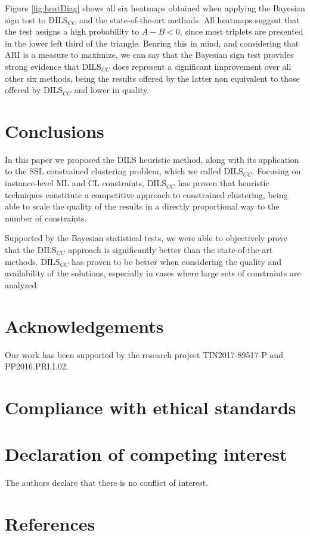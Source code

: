 \documentclass[review]{elsarticle}
\begin{document}
Figure \ref{fig:heatDiag} shows all six heatmaps obtained when applying the Bayesian sign test to DILS$_{CC}$ and the state-of-the-art methods. All heatmaps suggest that the test assigns a high probability to $A - B < 0$, since most triplets are presented in the lower left third of the triangle. Bearing this in mind, and considering that ARI is a measure to maximize, we can say that the Bayesian sign test provides strong evidence that DILS$_{CC}$ does represent a significant improvement over all other six methods, being the results offered by the latter non equivalent to those offered by DILS$_{CC}$ and lower in quality.

\clearpage

\section{Conclusions} \label{sec:conclusiones}

In this paper we proposed the DILS heuristic method, along with its application to the SSL constrained clustering problem, which we called DILS$_{CC}$. Focusing on instance-level ML and CL constraints, DILS$_{CC}$ has proven that heuristic techniques constitute a competitive approach to constrained clustering, being able to scale the quality of the results in a directly proportional way to the number of constraints.
 
Supported by the Bayesian statistical tests, we were able to objectively prove that the DILS$_{CC}$ approach is significantly better than the state-of-the-art methods. DILS$_{CC}$ has proven to be better when considering the quality and availability of the solutions, especially in cases where large sets of constraints are analyzed.

\section*{Acknowledgements}

Our work has been supported by the research project TIN2017-89517-P and PP2016.PRI.I.02.

\section*{Compliance with ethical standards}

\section*{Declaration of competing interest}

The authors declare that there is no conflict of interest.

\clearpage

\section*{References}


\end{document}
